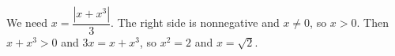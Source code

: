 We need $x=\dfrac{\left|x+x^3\right|}{3}$. The right side is nonnegative and $x\ne0$, so $x>0$. Then $x+x^3>0$ and $3x=x+x^3$, so $x^2=2$ and $x=\boxed{\sqrt2}$.
